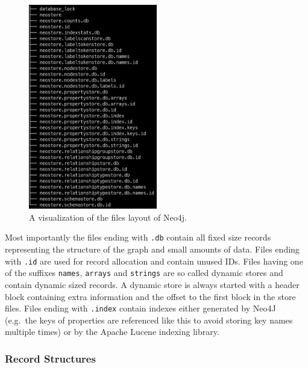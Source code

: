             \begin{figure}[htp]\label{files}
                \begin{center}
                    \includegraphics[keepaspectratio,height=0.4\textheight,width=0.5\textwidth]{img/03_record/files.png}
                \end{center}
                \caption{A visualization of the files layout of Neo4j.} %
            \end{figure}

            Most importantly the files ending with \texttt{.db} contain all fixed size records representing the structure of the graph and small amounts of data.
            Files ending with \texttt{.id} are used for record allocation and contain unused IDs. 
            Files having one of the suffixes \texttt{names}, \texttt{arrays} and \texttt{strings} are so called dynamic stores and contain dynamic sized records. 
            A dynamic store is always started with a header block containing extra information and the offset to the first block in the store files. 
            Files ending with \texttt{.index} contain indexes either generated by Neo4J (e.g.\ the keys of properties are referenced like this to avoid storing key names multiple times) or by the Apache Lucene indexing library.
            
        
        \subsubsection{Record Structures}
